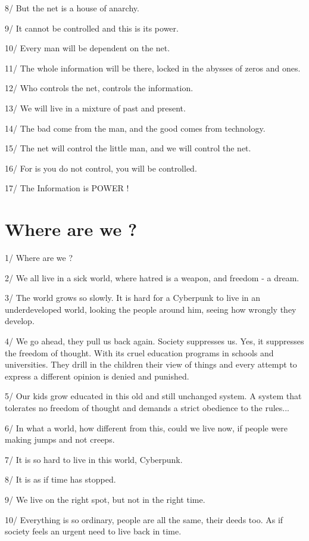\documentclass[letterpaper,12pt,english]{sphinxmanual}
\begin{document}
8/ But the net is a house of anarchy.

9/ It cannot be controlled and this is its power.

10/ Every man will be dependent on the net.

11/ The whole information will be there, locked in the abysses of zeros and ones.

12/ Who controls the net, controls the information.

13/ We will live in a mixture of past and present.

14/ The bad come from the man, and the good comes from technology.

15/ The net will control the little man, and we will control the net.

16/ For is you do not control, you will be controlled.

17/ The Information is POWER !


\section{Where are we ?}
\label{1997:where-are-we}
1/ Where are we ?

2/ We all live in a sick world, where hatred is a weapon, and freedom - a dream.

3/ The world grows so slowly. It is hard for a Cyberpunk to live in an underdeveloped world, looking the people around him, seeing how wrongly they develop.

4/ We go ahead, they pull us back again. Society suppresses us. Yes, it suppresses the freedom of thought. With its cruel education programs in schools and universities. They drill in the children their view of things and every attempt to express a different opinion is denied and punished.

5/ Our kids grow educated in this old and still unchanged system. A system that tolerates no freedom of thought and demands a strict obedience to the rules...

6/ In what a world, how different from this, could we live now, if people were making jumps and not creeps.

7/ It is so hard to live in this world, Cyberpunk.

8/ It is as if time has stopped.

9/ We live on the right spot, but not in the right time.

10/ Everything is so ordinary, people are all the same, their deeds too. As if society feels an urgent need to live back in time.
\end{document}
